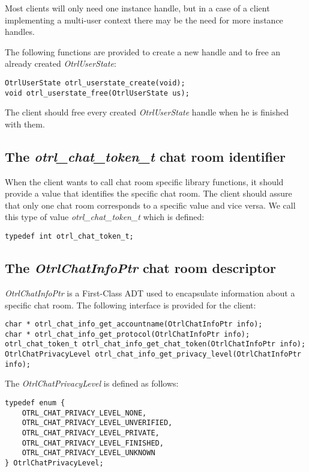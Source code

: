 Most clients will only need one instance handle, but in a case of a client implementing a multi-user context there may be the need for more instance handles.

The following functions are provided to create a new handle and to free an already created \emph{OtrlUserState}:
\begin{lstlisting}[caption={OtrlUserState interface}]
OtrlUserState otrl_userstate_create(void);
void otrl_userstate_free(OtrlUserState us);
\end{lstlisting}
The client should free every created \emph{OtrlUserState} handle when he is finished with them.

\subsection{The \emph{otrl\_chat\_token\_t} chat room identifier}
When the client wants to call chat room specific library functions, it should provide a value that identifies the specific chat room. The client should assure that only one chat room corresponds to a specific value and vice versa. We call this type of value \emph{otrl\_chat\_token\_t} which is defined:
\begin{lstlisting}[caption={otrl\_chat\_token\_t definition}]
typedef int otrl_chat_token_t;
\end{lstlisting}

\subsection{The \emph{OtrlChatInfoPtr} chat room descriptor}
\emph{OtrlChatInfoPtr} is a First-Class ADT used to encapsulate information about a specific chat room. The following interface is provided for the client:
\begin{lstlisting}[caption={OtrlChatInfoPtr First-Class ADT interface}]
char * otrl_chat_info_get_accountname(OtrlChatInfoPtr info);
char * otrl_chat_info_get_protocol(OtrlChatInfoPtr info);
otrl_chat_token_t otrl_chat_info_get_chat_token(OtrlChatInfoPtr info);
OtrlChatPrivacyLevel otrl_chat_info_get_privacy_level(OtrlChatInfoPtr info);
\end{lstlisting}

The \emph{OtrlChatPrivacyLevel} is defined as follows:
\begin{lstlisting}[caption={OtrlChatPrivacyLevel definition}]
typedef enum {
	OTRL_CHAT_PRIVACY_LEVEL_NONE,
	OTRL_CHAT_PRIVACY_LEVEL_UNVERIFIED,
	OTRL_CHAT_PRIVACY_LEVEL_PRIVATE,
	OTRL_CHAT_PRIVACY_LEVEL_FINISHED,
	OTRL_CHAT_PRIVACY_LEVEL_UNKNOWN
} OtrlChatPrivacyLevel;
\end{lstlisting}

